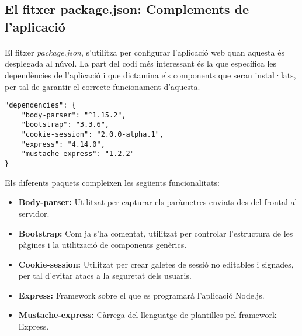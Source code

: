 \subsection{El fitxer package.json: Complements de l'aplicació}

    \paragraph{}
    El fitxer \emph{package.json}, s'utilitza per configurar l'aplicació web quan aquesta és desplegada al núvol. La part del codi més interessant és la que específica les dependències de l'aplicació i que dictamina els components que seran instal·lats, per tal de garantir el correcte funcionament d'aquesta.

    \begin{lstlisting}[style=rawOwn,caption={Dependències declarades en el fitxer pacakge.json}]
"dependencies": {
    "body-parser": "^1.15.2",
    "bootstrap": "3.3.6",
    "cookie-session": "2.0.0-alpha.1",
    "express": "4.14.0",
    "mustache-express": "1.2.2"
}
    \end{lstlisting}

    Els diferents paquets compleixen les següents funcionalitats:

    \begin{itemize}
        \item \textbf{Body-parser:} Utilitzat per capturar els paràmetres enviats des del frontal al servidor.
        \item \textbf{Bootstrap:} Com ja s'ha comentat, utilitzat per controlar l'estructura de les pàgines i la utilització de components genèrics.
        \item \textbf{Cookie-session:} Utilitzat per crear galetes de sessió no editables i signades, per tal d'evitar atacs a la seguretat dels usuaris.
        \item \textbf{Express:} Framework sobre el que es programarà l'aplicació Node.js.
        \item \textbf{Mustache-express:} Càrrega del llenguatge de plantilles pel framework Express.
    \end{itemize}

